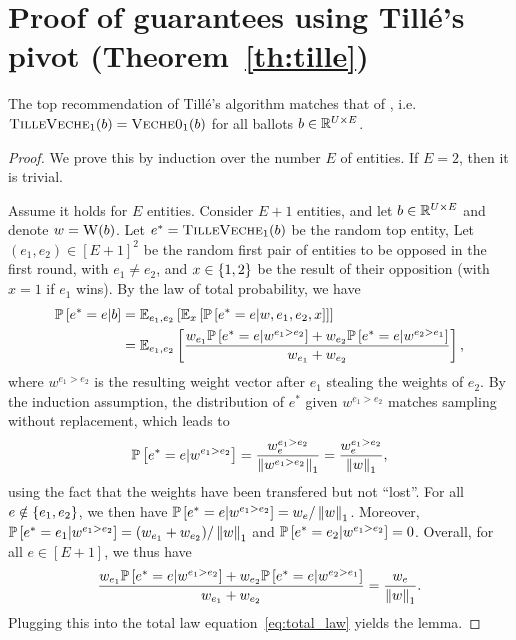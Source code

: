 \section{Proof of guarantees using Tillé's pivot (Theorem~\ref{th:tille})}
\label{app:tille}

\begin{lemma} \label{lemma:top_tille}
    The top recommendation of Tillé's algorithm matches that of \SimpleVeche{},
    i.e. $\textsc{TilleVeche}_{1} (b) = \textsc{Veche0}_{1} (b)$ 
    for all ballots $b \in \mathbb R^{U \times E}$.
\end{lemma}

\begin{proof}
    We prove this by induction over the number $E$ of entities.
    If $E = 2$, then it is trivial.

    Assume it holds for $E$ entities.
    Consider $E + 1$ entities,
    and let $b \in \mathbb R^{U \times E}$ and denote $w = \textsc{W}(b)$.
    Let $e^* = \textsc{TilleVeche}_1 (b)$ be the random top entity,
    Let $(e_1, e_2) \in [E + 1]^2$ be the random first pair of entities 
    to be opposed in the first round, with $e_1 \neq e_2$,
    and $x \in \left\lbrace 1, 2 \right\rbrace$ be the result of their opposition 
    (with $x = 1$ if $e_1$ wins).
    By the law of total probability, we have
    \begin{align}
        \mathbb P\left[e^* = e|b\right]
        &= \mathbb E_{e_1,e_2} \left[
            \mathbb E_x \left[ \mathbb P\left[e^* = e|w, e_1, e_2, x\right] \right]
        \right] \\
        &= \mathbb E_{e_1,e_2} \left[
            \frac{
                w_{e_1} \mathbb P\left[e^* = e | w^{e_1 > e_2}\right]
                + w_{e_2} \mathbb P\left[e^* = e | w^{e_2 > e_1}\right]
            }{w_{e_1} + w_{e_2}}
        \right], \label{eq:total_law}
    \end{align}
    where $w^{e_1 > e_2}$ is the resulting weight vector
    after $e_1$ stealing the weights of $e_2$.
    By the induction assumption,
    the distribution of $e^*$ given $w^{e_1 > e_2}$
    matches sampling without replacement,
    which leads to
    \begin{align}
        \mathbb P\left[e^* = e | w^{e_1 > e_2}\right]
        = \frac{w^{e_1 > e_2}_{e}}{\left\lVert{w^{e_1 > e_2}}\right\rVert_{1}}
        = \frac{w^{e_1 > e_2}_{e}}{\left\lVert{w}\right\rVert_{1}},
    \end{align}
    using the fact that the weights have been transfered but not ``lost''.
    For all $e \notin \left\lbrace e_1, e_2 \right\rbrace$,
    we then have $\mathbb P\left[e^* = e | w^{e_1 > e_2}\right] = w_e / \left\lVert{w}\right\rVert_{1}$.
    Moreover, $\mathbb P\left[e^* = e_1 | w^{e_1 > e_2}\right] = (w_{e_1} + w_{e_2}) / \left\lVert{w}\right\rVert_{1}$
    and $\mathbb P\left[e^* = e_2 | w^{e_1 > e_2}\right] = 0$.
    Overall, for all $e \in [E+1]$, we thus have
    \begin{align}
        \frac{
            w_{e_1} \mathbb P\left[e^* = e | w^{e_1 > e_2}\right]
            + w_{e_2} \mathbb P\left[e^* = e | w^{e_2 > e_1}\right]
        }{w_{e_1} + w_{e_2}}
        = \frac{w_e}{\left\lVert{w}\right\rVert_{1}}.
    \end{align}
    Plugging this into the total law equation~\eqref{eq:total_law}
    yields the lemma.
\end{proof}

